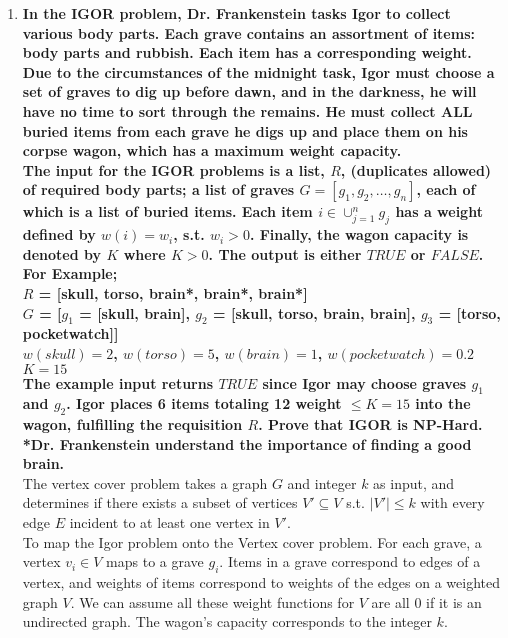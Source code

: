 \documentclass{article}
\begin{document}
\begin{enumerate}





\newpage
\item \textbf{In the IGOR problem, Dr. Frankenstein tasks Igor to collect various body parts. Each grave contains an assortment of items: body parts and rubbish. Each item has a corresponding weight. Due to the circumstances of the midnight task, Igor must choose a set of graves to dig up before dawn, and in the darkness, he will have no time to sort through the remains. He must collect ALL buried items from each grave he digs up and place them on his corpse wagon, which has a maximum weight capacity.} \\
\textbf{The input for the IGOR problems is a list, $R$, (duplicates allowed) of required body parts; a list of graves $G = [g_1, g_2, \dots, g_n]$, each of which is a list of buried items. Each item $i \in \cup_{j=1}^{n}g_j$ has a weight defined by $w(i) = w_i$, s.t. $w_i > 0$. Finally, the wagon capacity is denoted by $K$ where $K>0$. The output is either $TRUE$ or $FALSE$.} \\
\textbf{
For Example; \\
$R$ = [skull, torso, brain*, brain*, brain*] \\
$G$ = [$g_1$ = [skull, brain], $g_2$ = [skull, torso, brain, brain], $g_3$ = [torso, pocketwatch]] \\
$w(skull) = 2$, $w(torso) = 5$, $w(brain) = 1$, $w(pocketwatch) = 0.2$ \\
$K = 15$ \\
The example input returns $TRUE$ since Igor may choose graves $g_1$ and $g_2$. Igor places 6 items totaling 12 weight $\leq K = 15$ into the wagon, fulfilling the requisition $R$. Prove that IGOR is NP-Hard. \\
*Dr. Frankenstein understand the importance of finding a good brain.
} \\

The vertex cover problem takes a graph $G$ and integer $k$ as input, and determines if there exists a subset of vertices $V' \subseteq V$ s.t. $|V'| \leq k$ with every edge $E$ incident to at least one vertex in $V'$. \\

To map the Igor problem onto the Vertex cover problem. For each grave, a vertex $v_i \in V$ maps to a grave $g_i$. Items in a grave correspond to edges of a vertex, and weights of items correspond to weights of the edges on a weighted graph $V$. We can assume all these weight functions for $V$ are all 0 if it is an undirected graph. The wagon's capacity corresponds to the integer $k$. \\


\end{enumerate}
\end{document}
